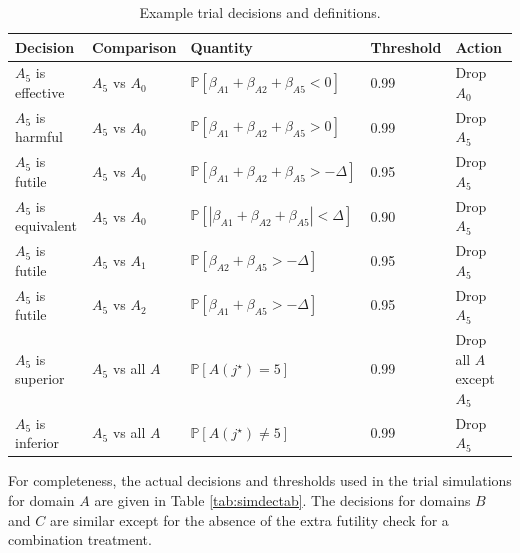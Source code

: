\documentclass[
]{article}
\begin{document}
\begin{table}[H]

\caption{\label{tab:dectab}Example trial decisions and definitions.}
\centering
\begin{tabular}[t]{lllll}
\toprule
Decision & Comparison & Quantity & Threshold & Action\\
\midrule
$A_5$ is effective & $A_5$ vs $A_0$ & $\mathbb P[\beta_{A1}+\beta_{A2}+\beta_{A5}<0]$ & 0.99 & Drop $A_0$\\
$A_5$ is harmful & $A_5$ vs $A_0$ & $\mathbb P[\beta_{A1}+\beta_{A2}+\beta_{A5}>0]$ & 0.99 & Drop $A_5$\\
$A_5$ is futile & $A_5$ vs $A_0$ & $\mathbb P[\beta_{A1}+\beta_{A2}+\beta_{A5}>-\Delta]$ & 0.95 & Drop $A_5$\\
$A_5$ is equivalent & $A_5$ vs $A_0$ & $\mathbb P[|\beta_{A1}+\beta_{A2}+\beta_{A5}|<\Delta]$ & 0.90 & Drop $A_5$\\
$A_5$ is futile & $A_5$ vs $A_1$ & $\mathbb P[\beta_{A2}+\beta_{A5}>-\Delta]$ & 0.95 & Drop $A_5$\\
$A_5$ is futile & $A_5$ vs $A_2$ & $\mathbb P[\beta_{A1}+\beta_{A5}>-\Delta]$ & 0.95 & Drop $A_5$\\
$A_5$ is superior & $A_5$ vs all $A$ & $\mathbb P[A(j^\star)=5]$ & 0.99 & Drop all $A$ except $A_5$\\
$A_5$ is inferior & $A_5$ vs all $A$ & $\mathbb P[A(j^\star)\ne5]$ & 0.99 & Drop $A_5$\\
\bottomrule
\end{tabular}
\end{table}

For completeness, the actual decisions and thresholds used in the trial simulations for domain \(A\) are given in Table \ref{tab:simdectab}.
The decisions for domains \(B\) and \(C\) are similar except for the absence of the extra futility check for a combination treatment.
\end{document}
